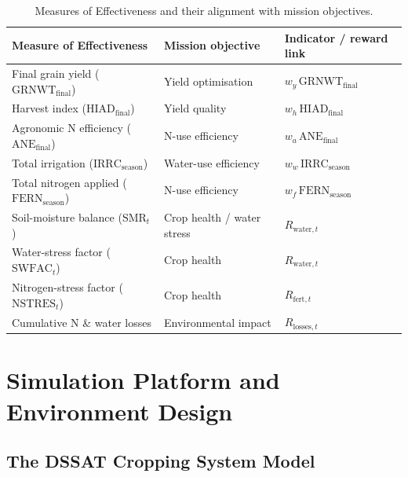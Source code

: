 \begin{table}[ht]
\centering
\caption{Measures of Effectiveness and their alignment with mission objectives.}
\label{tab:moe}
\small
\renewcommand{\arraystretch}{1.25}
\begin{tabular}{>{\raggedright\arraybackslash}p{4.4cm}
                >{\raggedright\arraybackslash}p{3.2cm}
                >{\raggedright\arraybackslash}p{4.6cm}}
\toprule
\textbf{Measure of Effectiveness} & \textbf{Mission objective} & \textbf{Indicator / reward link} \\
\midrule
Final grain yield ($\mathrm{GRNWT}_{\text{final}}$) & Yield optimisation & $w_y\,\mathrm{GRNWT}_{\text{final}}$ \\
Harvest index ($\mathrm{HIAD}_{\text{final}}$) & Yield quality & $w_h\,\mathrm{HIAD}_{\text{final}}$ \\
Agronomic N efficiency ($\mathrm{ANE}_{\text{final}}$) & N-use efficiency & $w_a\,\mathrm{ANE}_{\text{final}}$ \\
Total irrigation ($\mathrm{IRRC}_{\text{season}}$) & Water-use efficiency & $w_w\,\mathrm{IRRC}_{\text{season}}$ \\
Total nitrogen applied ($\mathrm{FERN}_{\text{season}}$) & N-use efficiency & $w_f\,\mathrm{FERN}_{\text{season}}$ \\
Soil-moisture balance ($\mathrm{SMR}_t$) & Crop health / water stress & $R_{\text{water},t}$ \\
Water-stress factor ($\mathrm{SWFAC}_t$) & Crop health & $R_{\text{water},t}$ \\
Nitrogen-stress factor ($\mathrm{NSTRES}_t$) & Crop health & $R_{\text{fert},t}$ \\
Cumulative N \& water losses & Environmental impact & $R_{\text{losses},t}$ \\
\bottomrule
\end{tabular}
\end{table}


\section{Simulation Platform and Environment Design}
\label{sec:env}

\subsection{The DSSAT Cropping System Model}

